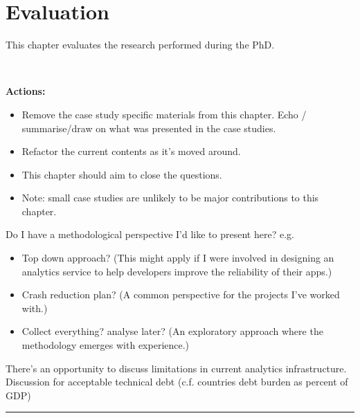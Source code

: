 \chapter{Evaluation}
\label{chapter-evaluation}

This chapter evaluates the research performed during the PhD.


~\href{section-sources}{} 


\textbf{Actions:} 
\begin{itemize}
    \item Remove the case study specific materials from this chapter. Echo / summarise/draw on what was presented in the case studies. 
    \item Refactor the current contents as it's moved around.
    \item This chapter should aim to close the questions. 
    \item Note: small case studies are unlikely to be major contributions to this chapter.
\end{itemize}



Do I have a methodological perspective I'd like to present here?
e.g.
\begin{itemize}
    \item Top down approach? (This might apply if I were involved in designing an analytics service to help developers improve the reliability of their apps.)
    \item Crash reduction plan? (A common perspective for the projects I've worked with.) 
    \item Collect everything? analyse later? (An exploratory approach where the methodology emerges with experience.)
\end{itemize}


There's an opportunity to discuss limitations in current analytics infrastructure. Discussion for acceptable technical debt (c.f. countries debt burden as percent of GDP)


\par\noindent\rule{\textwidth}{0.4pt}

